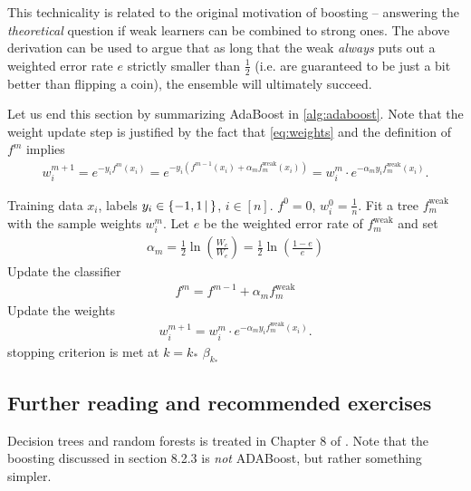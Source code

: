\documentclass{article}
\newcommand{\set}[2]{\{ #1 \, \vert \, #2\}}
\newcommand{\weak}{\mathrm{weak}}
\begin{document}
This technicality is related to the original motivation of boosting -- answering the \emph{theoretical} question if weak learners can be combined to strong ones. The above derivation can be used to argue that as long that the weak \emph{always} puts out a weighted error rate $e$ strictly smaller than $\tfrac{1}{2}$ (i.e. are guaranteed to be just a bit better than flipping a coin), the ensemble will ultimately succeed. \newline

Let us end this section by summarizing AdaBoost in \eqref{alg:adaboost}. Note that the weight update step is justified by the fact that  \eqref{eq:weights} and the definition of $f^m$ implies 
\begin{align*}
    w_i^{m+1} =e^{-y_if^{m}(x_i)} = e^{-y_i(f^{m-1}(x_i)+\alpha_mf_m^\weak(x_i))} = w_i^m \cdot e^{-\alpha_m y_if_m^\weak (x_i)}.
\end{align*}

\begin{algorithm}[tb]      
	\caption{AdaBoost for binary classification trees} 
	\label{alg:adaboost}
	\begin{algorithmic} [1]
 		\REQUIRE Training data $x_i$, labels $y_i \in \set{-1,1}$, $i\in [n]$.
 		\STATE $f^0=0$, $w_i^0 = \tfrac{1}{n}$.
 		\REPEAT
 			\STATE Fit a tree $f_m^\weak$ with the sample weights $w_i^{m}$.
            \STATE Let $e$ be the weighted error rate of $f_m^\weak$ and set 
            \begin{align*}
                \alpha_m =  \frac{1}{2}\ln\left(\frac{W_c}{W_e}\right) = \frac{1}{2}\ln\left(\frac{1-e}{e}\right)
            \end{align*}
            \STATE Update the classifier
            \begin{align*}
                f^m = f^{m-1}+\alpha_m f_m^{\mathrm{weak}}
            \end{align*}
            \STATE Update the weights
            \begin{align*}
                w_i^{m+1} = w_i^{m}\cdot e^{-\alpha_m y_if_m^\weak (x_i)}.
            \end{align*}
 		\UNTIL stopping criterion is met at $k= k_*$
 		\RETURN $\beta_{k_*}$
	\end{algorithmic}
\end{algorithm}

\subsection{Further reading and recommended exercises}
Decision trees and random forests is treated in Chapter 8 of \cite{james2023introduction}. Note that the boosting discussed in section 8.2.3 is \emph{not} ADABoost, but rather something simpler.
\end{document}
